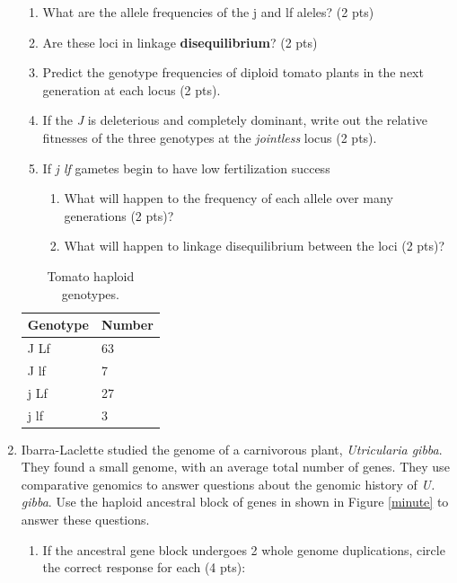 \documentclass[]{article}
\begin{document}
\begin{enumerate}
\begin{enumerate}
\item What are the allele frequencies of the j and lf aleles? (2 pts) 
\item Are these loci in linkage {\bf disequilibrium}? (2 pts)
\item Predict the genotype frequencies of diploid tomato plants in the next generation at each locus (2 pts).
\item If the \emph{J} is deleterious and completely dominant, write out the relative fitnesses of the three genotypes at the \emph{jointless} locus (2 pts).
\item If \emph{j lf} gametes begin to have low fertilization success
\begin{enumerate}
\item What will happen to the frequency of each allele over many generations (2 pts)?
\item What will happen to linkage disequilibrium between the loci (2 pts)?
\end{enumerate} 
\end{enumerate}

\begin{table}[h]
\caption[]{Tomato haploid genotypes.}
\begin{center}
\begin{tabular}{ll}
Genotype & Number \\  \hline
J Lf & 63\\  
J lf & 7\\
j Lf & 27\\
j lf & 3\\

\end{tabular}
\end{center}
\label{tomaters}
\end{table}

\newpage
\item Ibarra-Laclette studied the genome of a carnivorous plant, \emph{Utricularia gibba}.  They found a small genome, with an average total number of genes.  They use comparative genomics to answer questions about the genomic history of \emph{U. gibba}.  Use the haploid ancestral block of genes in shown in Figure \ref{minute} to answer these questions.

\begin{enumerate}
\item If the ancestral gene block undergoes 2 whole genome duplications, circle the correct response for each (4 pts):\\


\end{enumerate}
\end{enumerate}
\end{document}
